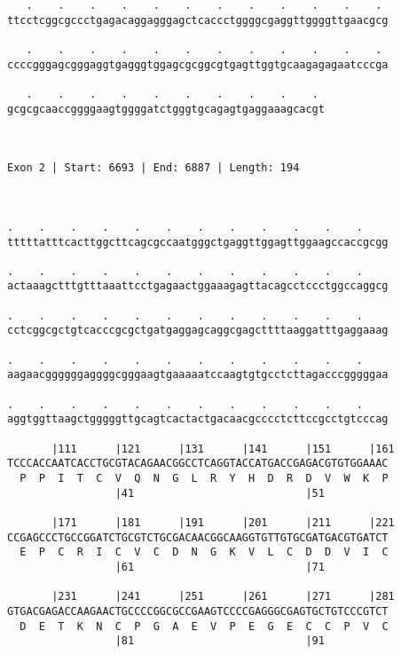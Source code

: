 \documentclass{article}
\begin{document}
\begin{Verbatim}
   .    .    .    .    .    .    .    .    .    .    .    . 
ttcctcggcgccctgagacaggagggagctcaccctggggcgaggttggggttgaacgcg
                                                            
   .    .    .    .    .    .    .    .    .    .    .    . 
ccccgggagcgggaggtgagggtggagcgcggcgtgagttggtgcaagagagaatcccga
                                                            
   .    .    .    .    .    .    .    .    .    . 
gcgcgcaaccggggaagtggggatctgggtgcagagtgaggaaagcacgt
                                                  
                                                  
 
Exon 2 | Start: 6693 | End: 6887 | Length: 194



.    .    .    .    .    .    .    .    .    .    .    .    
tttttatttcacttggcttcagcgccaatgggctgaggttggagttggaagccaccgcgg
                                                            
.    .    .    .    .    .    .    .    .    .    .    .    
actaaagctttgtttaaattcctgagaactggaaagagttacagcctccctggccaggcg
                                                            
.    .    .    .    .    .    .    .    .    .    .    .    
cctcggcgctgtcacccgcgctgatgaggagcaggcgagcttttaaggatttgaggaaag
                                                            
.    .    .    .    .    .    .    .    .    .    .    .    
aagaacggggggaggggcgggaagtgaaaaatccaagtgtgcctcttagacccgggggaa
                                                            
.    .    .    .    .    .    .    .    .    .    .    .    
aggtggttaagctgggggttgcagtcactactgacaacgcccctcttccgcctgtcccag
                                                            
       |111      |121      |131      |141      |151      |161
TCCCACCAATCACCTGCGTACAGAACGGCCTCAGGTACCATGACCGAGACGTGTGGAAAC
  P  P  I  T  C  V  Q  N  G  L  R  Y  H  D  R  D  V  W  K  P
                 |41                           |51          
  
       |171      |181      |191      |201      |211      |221
CCGAGCCCTGCCGGATCTGCGTCTGCGACAACGGCAAGGTGTTGTGCGATGACGTGATCT
  E  P  C  R  I  C  V  C  D  N  G  K  V  L  C  D  D  V  I  C
                 |61                           |71          
  
       |231      |241      |251      |261      |271      |281
GTGACGAGACCAAGAACTGCCCCGGCGCCGAAGTCCCCGAGGGCGAGTGCTGTCCCGTCT
  D  E  T  K  N  C  P  G  A  E  V  P  E  G  E  C  C  P  V  C
                 |81                           |91          
  

\end{Verbatim}
\end{document}
